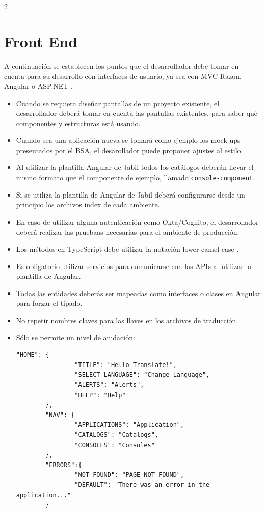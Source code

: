 \documentclass[a4paper, 10pt]{article}
\begin{document}
\begin{multicols}{2}
\section{Front End}
A continuación se establecen los puntos que el desarrollador debe tomar en cuenta para su desarrollo con interfaces de usuario, ya sea con \sffamily MVC Razon, Angular o ASP.NET \normalfont.

\begin{itemize}
	\item Cuando se requiera diseñar pantallas de un proyecto existente, el desarrollador deberá tomar en cuenta las pantallas existentes, para saber qué componentes y estructuras está usando.
	\item Cuando sea una aplicación nueva se tomará como ejemplo los mock ups presentados por el BSA, el desarollador puede proponer ajustes al estilo.
	\item Al utilizar la plantilla Angular de Jabil todos los catálogos deberán llevar el mismo formato que el componente de ejemplo, llamado \texttt{console-component}.
	
	\item Si se utiliza la plantilla de Angular de Jabil deberá configurarse desde un principio los archivos \sffamily index \normalfont de cada ambiente.
	\item En caso de utilizar alguna autenticación como Okta/Cognito, el desarrollador deberá realizar las pruebaas necesarias para el ambiente de producción.
	\item Los métodos en TypeScript debe utilizar la notación \sffamily lower camel case \normalfont .
\end{itemize}
\end{multicols}

\begin{itemize}
		\item Es obligatorio utilizar servicios para comunicarse con las APIs al utilizar la plantilla de Angular.
		
		\item Todas las entidades deberás ser mapeadas como interfaces o clases en Angular para forzar el tipado.
		
		\item No repetir nombres claves para las llaves en los archivos de traducción.
		
		\item Sólo se permite un nivel de anidación:
		\begin{lstlisting}[language={[Sharp]C}]
		"HOME": {
				"TITLE": "Hello Translate!",
				"SELECT_LANGUAGE": "Change Language",
				"ALERTS": "Alerts",
				"HELP": "Help"
		},
		"NAV": {
				"APPLICATIONS": "Application",
				"CATALOGS": "Catalogs",
				"CONSOLES": "Consoles"
		},
		"ERRORS":{
				"NOT_FOUND": "PAGE NOT FOUND",
				"DEFAULT": "There was an error in the application..."
		}
		\end{lstlisting}
		
\end{itemize}
\end{document}
